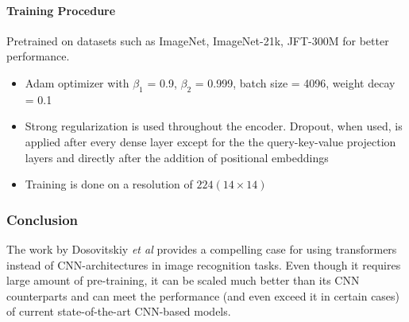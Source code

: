 \paragraph{Training Procedure}
\par Pretrained on datasets such as ImageNet, ImageNet-21k, JFT-300M for better performance.
\begin{itemize}
	\item Adam optimizer with $\beta_1$ = 0.9, $\beta_2$ = 0.999, batch size = 4096, weight decay = 0.1
	\item Strong regularization is used throughout the encoder. Dropout, when used, is applied after every dense layer except for the the query-key-value projection layers and directly after the addition of positional embeddings
	\item Training is done on a resolution of $224 (14 \times 14)$
\end{itemize}

\subsubsection{Conclusion}
\par The work by Dosovitskiy \textit{et al} provides a compelling case for using transformers instead of CNN-architectures in image recognition tasks. Even though it requires large amount of pre-training, it can be scaled much better than its CNN counterparts and can meet the performance (and even exceed it in certain cases) of current state-of-the-art CNN-based models.
